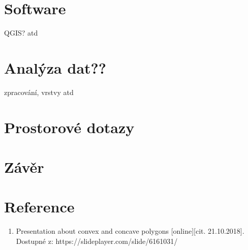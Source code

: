 \documentclass[a4paper, 12pt]{article}
\begin{document}
\section{Software}
QGIS? atd


\section{Analýza dat??}
zpracování, vrstvy atd

\section{Prostorové dotazy}

\section{Závěr}

\clearpage
\section{Reference}

\begin{enumerate}
\item  Presentation about convex and concave polygons [online][cit. 21.10.2018]. \\
Dostupné z: https://slideplayer.com/slide/6161031/  \\


\end{enumerate}
\end{document}
